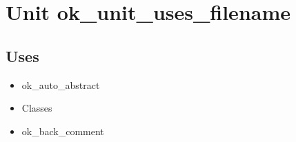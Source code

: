 \documentclass{report}
\begin{document}
\newlength{\tmplength}
\chapter{Unit ok{\_}unit{\_}uses{\_}filename}
\section{Uses}
\begin{itemize}
\item \begin{ttfamily}ok{\_}auto{\_}abstract\end{ttfamily}\item \begin{ttfamily}Classes\end{ttfamily}\item \begin{ttfamily}ok{\_}back{\_}comment\end{ttfamily}\end{itemize}
\end{document}
